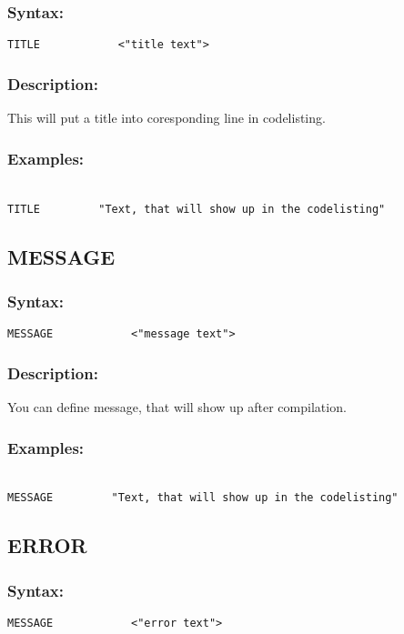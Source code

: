 {        \subsubsection{Syntax:}
            \verb'TITLE            <"title text">'

        \subsubsection{Description:}
        This will put a title into coresponding line in codelisting.  

        \subsubsection{Examples:}
            {
                ~\\
                \usecodefont
                \verb'TITLE         "Text, that will show up in the codelisting"'
            }

    \subsection{MESSAGE}
        \subsubsection{Syntax:}
            \verb'MESSAGE            <"message text">'

        \subsubsection{Description:}
            You can define message, that will show up after compilation.  

        \subsubsection{Examples:}
            {
                ~\\
                \usecodefont
                \verb'MESSAGE         "Text, that will show up in the codelisting"'
            }

    \subsection{ERROR}
        \subsubsection{Syntax:}
            \verb'MESSAGE            <"error text">'
            
}
